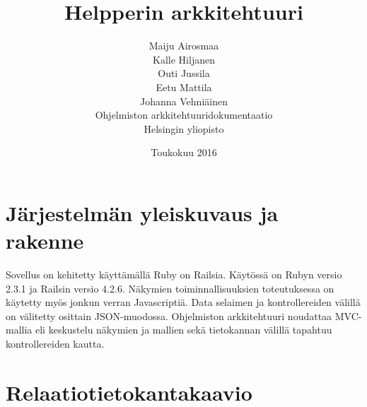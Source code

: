 \documentclass[a4paper,12pt, titlepage]{article}
\title{Helpperin arkkitehtuuri}
\author{ Maiju Airosmaa \\ Kalle Hiljanen \\
Outi Jussila \\ Eetu Mattila \\ Johanna Vehniäinen \\[1cm] Ohjelmiston arkkitehtuuridokumentaatio \\ Helsingin yliopisto}
\date{Toukokuu 2016}
\begin{document}
\maketitle

\tableofcontents
\newpage

\section{Järjestelmän yleiskuvaus ja rakenne}
\noindent
Sovellus on kehitetty käyttämällä Ruby on Railsia. Käytössä on Rubyn versio 2.3.1 ja Railsin versio 4.2.6. Näkymien toiminnallisuuksien toteutuksessa on käytetty myös jonkun verran Javascriptiä. Data selaimen ja kontrollereiden välillä on välitetty osittain JSON-muodossa.
\newline
\newline
Ohjelmiston arkkitehtuuri noudattaa MVC-mallia eli keskustelu näkymien ja mallien sekä tietokannan välillä tapahtuu kontrollereiden kautta.

\section{Relaatiotietokantakaavio}
\end{document}
